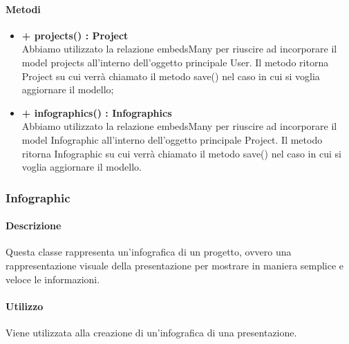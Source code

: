 	\paragraph{Metodi}
	\begin{itemize}
		\item \textbf{+ projects() : Project}\\
		Abbiamo utilizzato la relazione embedsMany per riuscire ad incorporare il model projects all'interno dell'oggetto principale User. Il metodo ritorna Project su cui verrà chiamato il metodo save() nel caso in cui si voglia aggiornare il modello;
		\item \textbf{+ infographics() : Infographics}\\
		Abbiamo utilizzato la relazione embedsMany per riuscire ad incorporare il model Infographic all’interno dell’oggetto principale Project. Il metodo ritorna Infographic su cui verrà chiamato il metodo save() nel caso in cui si voglia aggiornare il modello.
	\end{itemize}
\newpage


\subsubsection{Infographic}


	\paragraph{Descrizione}
	Questa classe rappresenta un’infografica di un progetto, ovvero una rappresentazione visuale della presentazione per mostrare in maniera semplice e veloce le informazioni.
	
	\paragraph{Utilizzo}
	Viene utilizzata alla creazione di un’infografica di una presentazione.

